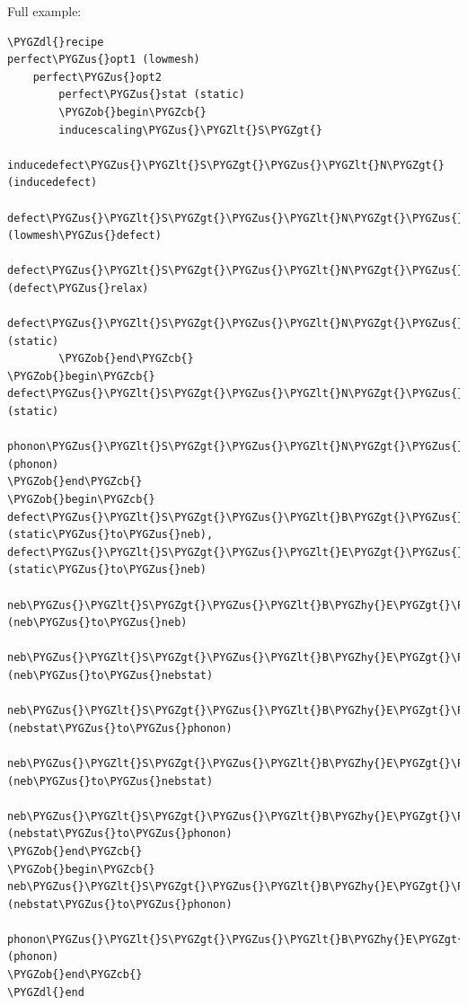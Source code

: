 \documentclass[letterpaper,10pt,english]{sphinxmanual}
\def\PYGZus{\char`\_}
\def\PYGZob{\char`\{}
\def\PYGZcb{\char`\}}
\def\PYGZlt{\char`\<}
\def\PYGZgt{\char`\>}
\def\PYGZdl{\char`\$}
\def\PYGZhy{\char`\-}
\begin{document}
Full example:

\begin{Verbatim}[commandchars=\\\{\}]
\PYGZdl{}recipe
perfect\PYGZus{}opt1 (lowmesh)
    perfect\PYGZus{}opt2
        perfect\PYGZus{}stat (static)
        \PYGZob{}begin\PYGZcb{}
        inducescaling\PYGZus{}\PYGZlt{}S\PYGZgt{}
            inducedefect\PYGZus{}\PYGZlt{}S\PYGZgt{}\PYGZus{}\PYGZlt{}N\PYGZgt{} (inducedefect)
                defect\PYGZus{}\PYGZlt{}S\PYGZgt{}\PYGZus{}\PYGZlt{}N\PYGZgt{}\PYGZus{}\PYGZlt{}Q\PYGZgt{}\PYGZus{}opt1 (lowmesh\PYGZus{}defect)
                    defect\PYGZus{}\PYGZlt{}S\PYGZgt{}\PYGZus{}\PYGZlt{}N\PYGZgt{}\PYGZus{}\PYGZlt{}Q\PYGZgt{}\PYGZus{}opt2 (defect\PYGZus{}relax)
                        defect\PYGZus{}\PYGZlt{}S\PYGZgt{}\PYGZus{}\PYGZlt{}N\PYGZgt{}\PYGZus{}\PYGZlt{}Q\PYGZgt{}\PYGZus{}stat (static)
        \PYGZob{}end\PYGZcb{}
\PYGZob{}begin\PYGZcb{}
defect\PYGZus{}\PYGZlt{}S\PYGZgt{}\PYGZus{}\PYGZlt{}N\PYGZgt{}\PYGZus{}\PYGZlt{}Q\PYGZgt{}\PYGZus{}stat (static)
    phonon\PYGZus{}\PYGZlt{}S\PYGZgt{}\PYGZus{}\PYGZlt{}N\PYGZgt{}\PYGZus{}\PYGZlt{}Q\PYGZgt{}\PYGZus{}\PYGZlt{}P\PYGZgt{} (phonon)
\PYGZob{}end\PYGZcb{}
\PYGZob{}begin\PYGZcb{}
defect\PYGZus{}\PYGZlt{}S\PYGZgt{}\PYGZus{}\PYGZlt{}B\PYGZgt{}\PYGZus{}\PYGZlt{}Q\PYGZgt{}\PYGZus{}stat (static\PYGZus{}to\PYGZus{}neb), defect\PYGZus{}\PYGZlt{}S\PYGZgt{}\PYGZus{}\PYGZlt{}E\PYGZgt{}\PYGZus{}\PYGZlt{}Q\PYGZgt{}\PYGZus{}stat (static\PYGZus{}to\PYGZus{}neb)
    neb\PYGZus{}\PYGZlt{}S\PYGZgt{}\PYGZus{}\PYGZlt{}B\PYGZhy{}E\PYGZgt{}\PYGZus{}\PYGZlt{}Q\PYGZgt{}\PYGZus{}opt1 (neb\PYGZus{}to\PYGZus{}neb)
        neb\PYGZus{}\PYGZlt{}S\PYGZgt{}\PYGZus{}\PYGZlt{}B\PYGZhy{}E\PYGZgt{}\PYGZus{}\PYGZlt{}Q\PYGZgt{}\PYGZus{}opt2 (neb\PYGZus{}to\PYGZus{}nebstat)
            neb\PYGZus{}\PYGZlt{}S\PYGZgt{}\PYGZus{}\PYGZlt{}B\PYGZhy{}E\PYGZgt{}\PYGZus{}\PYGZlt{}Q\PYGZgt{}\PYGZus{}stat (nebstat\PYGZus{}to\PYGZus{}phonon)
    neb\PYGZus{}\PYGZlt{}S\PYGZgt{}\PYGZus{}\PYGZlt{}B\PYGZhy{}E\PYGZgt{}\PYGZus{}\PYGZlt{}Q\PYGZgt{}\PYGZus{}opt2 (neb\PYGZus{}to\PYGZus{}nebstat)
    neb\PYGZus{}\PYGZlt{}S\PYGZgt{}\PYGZus{}\PYGZlt{}B\PYGZhy{}E\PYGZgt{}\PYGZus{}\PYGZlt{}Q\PYGZgt{}\PYGZus{}stat (nebstat\PYGZus{}to\PYGZus{}phonon)
\PYGZob{}end\PYGZcb{}
\PYGZob{}begin\PYGZcb{}
neb\PYGZus{}\PYGZlt{}S\PYGZgt{}\PYGZus{}\PYGZlt{}B\PYGZhy{}E\PYGZgt{}\PYGZus{}\PYGZlt{}Q\PYGZgt{}\PYGZus{}stat (nebstat\PYGZus{}to\PYGZus{}phonon)
    phonon\PYGZus{}\PYGZlt{}S\PYGZgt{}\PYGZus{}\PYGZlt{}B\PYGZhy{}E\PYGZgt{}\PYGZus{}\PYGZlt{}Q\PYGZgt{}\PYGZus{}\PYGZlt{}P\PYGZgt{} (phonon)
\PYGZob{}end\PYGZcb{}
\PYGZdl{}end
\end{Verbatim}
\end{document}
